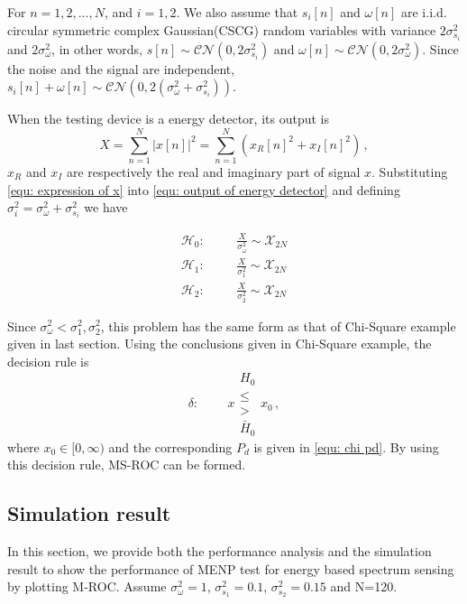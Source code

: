 \documentclass[12pt,journal,a4paper,twoside,onecolumn,draft]{IEEEtran}
\begin{document}
\begin{spacing}{2.5}
For $n = 1, 2, ..., N$, and $i = 1, 2$. We also assume that $s_i[n]$ and $\omega[n]$ are i.i.d. circular symmetric complex Gaussian(CSCG) random variables with variance $2\sigma_{s_i}^2$ and $2\sigma_{\omega}^2$, in other words, $s[n] \sim \mathcal{CN}(0, 2\sigma_{s_i}^2) $ and $\omega[n] \sim \mathcal{CN}(0, 2\sigma_\omega^2)$. Since the noise and the signal are independent, $s_i[n] + \omega[n] \sim \mathcal{CN}(0, 2(\sigma_\omega^2 + \sigma_{s_i}^2))$.

When the testing device is a energy detector, its output is
\begin{equation}
  \label{equ: output of energy detector}
  X = \sum_{n=1}^{N}|x[n]|^2 = \sum_{n=1}^{N}(x_R[n]^2+x_I[n]^2)\,,
\end{equation}
$x_R$ and $x_I$ are respectively the real and imaginary part of signal $x$. Substituting \eqref{equ: expression of x} into \eqref{equ: output of energy detector} and defining $\sigma_{i}^2 = \sigma_\omega^2 + \sigma_{s_i}^2$ we have

  \begin{equation}
   \label{v3eq7}
   \begin{split}
     \mathcal{H}_0:\;\;\;\;\;\;&\frac{X}{\sigma_\omega^2} \sim \mathcal{X}_{2N}\\
     \mathcal{H}_1:\;\;\;\;\;\;&\frac{X}{\sigma_1^2} \sim \mathcal{X}_{2N}\\
     \mathcal{H}_2:\;\;\;\;\;\;&\frac{X}{\sigma_{2}^2} \sim \mathcal{X}_{2N}
     \end{split}
 \end{equation}


Since $\sigma_\omega^2 < \sigma_1^2, \sigma_2^2$, this problem has the same form as that of Chi-Square example given in last section.  Using the conclusions given in Chi-Square example,  the decision rule is
\begin{equation}
\label{equ: decision rule for spectrum sensing}
\delta:\;\;\;\;\;\;\;\; x \substack{H_0 \\ \leq \\ > \\\bar{H}_0} x_0\,,
 \end{equation}
where $x_0 \in [0, \infty)$ and  the corresponding $P_d$ is given in \eqref{equ: chi pd}. By using this decision rule,  MS-ROC can be formed.

\subsection{Simulation result}
In this section, we provide both the performance analysis and the simulation result to show the performance of MENP test for energy based spectrum sensing by plotting M-ROC.  
Assume $\sigma_\omega^2 = 1$, $\sigma_{s_1}^2 = 0.1$, $\sigma_{s_2}^2  = 0.15$ and N=120.


\end{spacing}
\end{document}
